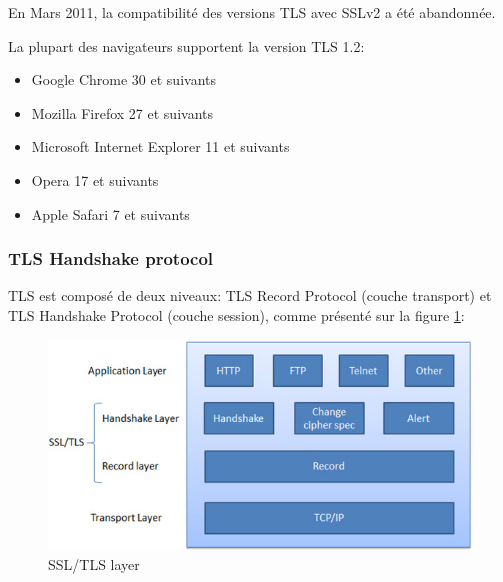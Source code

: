  En Mars 2011, la compatibilité des versions TLS avec SSLv2 a été abandonnée. %

La plupart des navigateurs supportent la version TLS 1.2:
\begin{itemize}
\item Google Chrome 30 et suivants
\item Mozilla Firefox 27 et suivants
\item Microsoft Internet Explorer 11 et suivants
\item Opera 17 et suivants
\item Apple Safari 7 et suivants
\end{itemize}


\subsubsection{TLS Handshake protocol}

TLS est composé de deux niveaux: TLS Record Protocol (couche transport) et TLS Handshake Protocol (couche session), comme présenté sur la figure \ref{ssl-tls-diag}: \\

\begin{figure}[H]
  \centering
  \includegraphics[scale=0.5]{img/ssl-tls-diag.jpg}
  \caption{SSL/TLS layer}
  \label{ssl-tls-diag}
\end{figure}  


